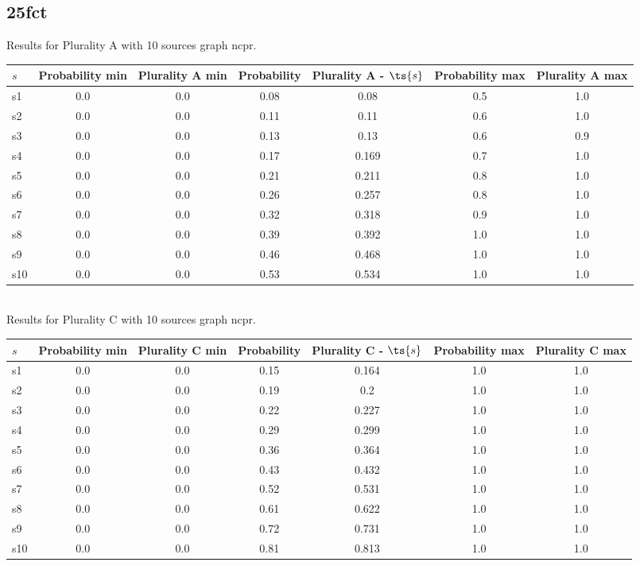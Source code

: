 \documentclass{article}
\begin{document}
\newpage

\subsection{25fct}

\noindent Results for Plurality A with 10 sources graph ncpr.

\noindent\begin{tabular}{|l|c|c|c|c|c|c|}
\hline
$s$& Probability min & Plurality A min & Probability & Plurality A - $\ts{s}$ & Probability max & Plurality A max\\
\hline
s1 &0.0 & 0.0 & 0.08 & 0.08 & 0.5 & 1.0\\
\hline
s2 &0.0 & 0.0 & 0.11 & 0.11 & 0.6 & 1.0\\
\hline
s3 &0.0 & 0.0 & 0.13 & 0.13 & 0.6 & 0.9\\
\hline
s4 &0.0 & 0.0 & 0.17 & 0.169 & 0.7 & 1.0\\
\hline
s5 &0.0 & 0.0 & 0.21 & 0.211 & 0.8 & 1.0\\
\hline
s6 &0.0 & 0.0 & 0.26 & 0.257 & 0.8 & 1.0\\
\hline
s7 &0.0 & 0.0 & 0.32 & 0.318 & 0.9 & 1.0\\
\hline
s8 &0.0 & 0.0 & 0.39 & 0.392 & 1.0 & 1.0\\
\hline
s9 &0.0 & 0.0 & 0.46 & 0.468 & 1.0 & 1.0\\
\hline
s10 &0.0 & 0.0 & 0.53 & 0.534 & 1.0 & 1.0\\
\hline
\end{tabular}\\

\noindent Results for Plurality C with 10 sources graph ncpr.

\noindent\begin{tabular}{|l|c|c|c|c|c|c|}
\hline
$s$& Probability min & Plurality C min & Probability & Plurality C - $\ts{s}$ & Probability max & Plurality C max\\
\hline
s1 &0.0 & 0.0 & 0.15 & 0.164 & 1.0 & 1.0\\
\hline
s2 &0.0 & 0.0 & 0.19 & 0.2 & 1.0 & 1.0\\
\hline
s3 &0.0 & 0.0 & 0.22 & 0.227 & 1.0 & 1.0\\
\hline
s4 &0.0 & 0.0 & 0.29 & 0.299 & 1.0 & 1.0\\
\hline
s5 &0.0 & 0.0 & 0.36 & 0.364 & 1.0 & 1.0\\
\hline
s6 &0.0 & 0.0 & 0.43 & 0.432 & 1.0 & 1.0\\
\hline
s7 &0.0 & 0.0 & 0.52 & 0.531 & 1.0 & 1.0\\
\hline
s8 &0.0 & 0.0 & 0.61 & 0.622 & 1.0 & 1.0\\
\hline
s9 &0.0 & 0.0 & 0.72 & 0.731 & 1.0 & 1.0\\
\hline
s10 &0.0 & 0.0 & 0.81 & 0.813 & 1.0 & 1.0\\
\hline
\end{tabular}\\
\end{document}
